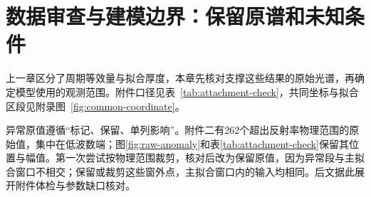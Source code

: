 \section{数据审查与建模边界：保留原谱和未知条件}

上一章区分了周期等效量与拟合厚度，本章先核对支撑这些结果的原始光谱，再确定模型使用的观测范围。附件口径见表~\ref{tab:attachment-check}，共同坐标与拟合区段见附录图~\ref{fig:common-coordinate}。

异常原值遵循“标记、保留、单列影响”。附件二有262个超出反射率物理范围的原始值，集中在低波数端；图\ref{fig:raw-anomaly}和表\ref{tab:attachment-check}保留其位置与幅值。第一次尝试按物理范围裁剪，核对后改为保留原值，因为异常段与主拟合窗口不相交；保留或裁剪这些窗外点，主拟合窗口内的输入均相同。后文据此展开附件体检与参数缺口核对。
